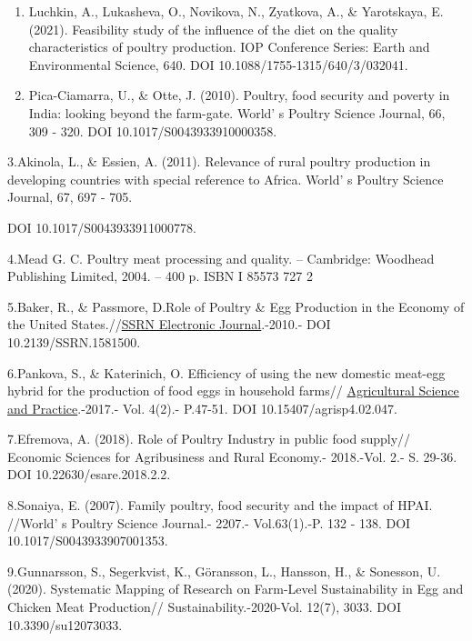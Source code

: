 \begin{references}
\begin{enumerate}
\def\labelenumi{\arabic{enumi}.}
\item
  Luchkin, A., Lukasheva, O., Novikova, N., Zyatkova, A., \& Yarotskaya,
  E. (2021). Feasibility study of the influence of the diet on the
  quality characteristics of poultry production. IOP Conference Series:
  Earth and Environmental Science, 640. DOI
  10.1088/1755-1315/640/3/032041.
\item
  Pica-Ciamarra, U., \& Otte, J. (2010). Poultry, food security and
  poverty in India: looking beyond the farm-gate.
  World' s Poultry Science Journal, 66, 309 - 320. DOI
  10.1017/S0043933910000358.
\end{enumerate}

3.Akinola, L., \& Essien, A. (2011). Relevance of rural poultry
production in developing countries with special reference to Africa.
World' s Poultry Science Journal, 67, 697 - 705.

DOI 10.1017/S0043933911000778.

4.Mead G. C. Poultry meat processing and quality. -- Cambridge: Woodhead
Publishing Limited, 2004. -- 400 p. ISBN I 85573 727 2

5.Baker, R., \& Passmore, D.Role of Poultry \& Egg Production in the
Economy of the United
States.//\href{https://www.researchgate.net/journal/SSRN-Electronic-Journal-1556-5068?_tp=eyJjb250ZXh0Ijp7ImZpcnN0UGFnZSI6InB1YmxpY2F0aW9uIiwicGFnZSI6InB1YmxpY2F0aW9uIn19}{SSRN
Electronic Journal}.-2010.- DOI 10.2139/SSRN.1581500.

6.Pankova, S., \& Katerinich, O. Efficiency of using the new domestic
meat-egg hybrid for the production of food eggs in household farms//
\href{https://agrisp.com/index.php/agrisp/issue/view/11}{Agricultural
Science and Practice}.-2017.- Vol. 4(2).- P.47-51. DOI
10.15407/agrisp4.02.047.

7.Efremova, A. (2018). Role of Poultry Industry in public food supply//
Economic Sciences for Agribusiness and Rural Economy.- 2018.-Vol. 2.- S.
29-36. DOI 10.22630/esare.2018.2.2.

8.Sonaiya, E. (2007). Family poultry, food security and the impact of
HPAI. //World' s Poultry Science Journal.- 2207.-
Vol.63(1).-P. 132 - 138. DOI 10.1017/S0043933907001353.

9.Gunnarsson, S., Segerkvist, K., Göransson, L., Hansson, H., \&
Sonesson, U. (2020). Systematic Mapping of Research on Farm-Level
Sustainability in Egg and Chicken Meat Production//
Sustainability.-2020-Vol. 12(7), 3033. DOI 10.3390/su12073033.


\end{references}
